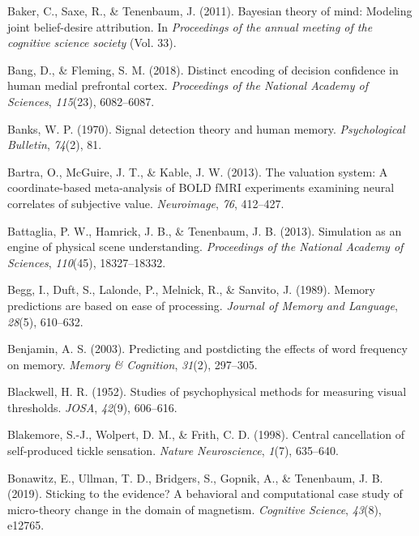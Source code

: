 \documentclass[12pt,twoside]{reedthesis}
\newenvironment{CSLReferences}%
  {}%
  {\par}
\begin{document}
\begin{CSLReferences}{1}{0}
\leavevmode\hypertarget{ref-baker2011bayesian}{}%
Baker, C., Saxe, R., \& Tenenbaum, J. (2011). Bayesian theory of mind: Modeling joint belief-desire attribution. In \emph{Proceedings of the annual meeting of the cognitive science society} (Vol. 33).

\leavevmode\hypertarget{ref-bang2018distinct}{}%
Bang, D., \& Fleming, S. M. (2018). Distinct encoding of decision confidence in human medial prefrontal cortex. \emph{Proceedings of the National Academy of Sciences}, \emph{115}(23), 6082--6087.

\leavevmode\hypertarget{ref-banks1970signal}{}%
Banks, W. P. (1970). Signal detection theory and human memory. \emph{Psychological Bulletin}, \emph{74}(2), 81.

\leavevmode\hypertarget{ref-bartra2013valuation}{}%
Bartra, O., McGuire, J. T., \& Kable, J. W. (2013). The valuation system: A coordinate-based meta-analysis of BOLD fMRI experiments examining neural correlates of subjective value. \emph{Neuroimage}, \emph{76}, 412--427.

\leavevmode\hypertarget{ref-battaglia2013simulation}{}%
Battaglia, P. W., Hamrick, J. B., \& Tenenbaum, J. B. (2013). Simulation as an engine of physical scene understanding. \emph{Proceedings of the National Academy of Sciences}, \emph{110}(45), 18327--18332.

\leavevmode\hypertarget{ref-begg1989memory}{}%
Begg, I., Duft, S., Lalonde, P., Melnick, R., \& Sanvito, J. (1989). Memory predictions are based on ease of processing. \emph{Journal of Memory and Language}, \emph{28}(5), 610--632.

\leavevmode\hypertarget{ref-benjamin2003predicting}{}%
Benjamin, A. S. (2003). Predicting and postdicting the effects of word frequency on memory. \emph{Memory \& Cognition}, \emph{31}(2), 297--305.

\leavevmode\hypertarget{ref-blackwell1952studies}{}%
Blackwell, H. R. (1952). Studies of psychophysical methods for measuring visual thresholds. \emph{JOSA}, \emph{42}(9), 606--616.

\leavevmode\hypertarget{ref-blakemore1998central}{}%
Blakemore, S.-J., Wolpert, D. M., \& Frith, C. D. (1998). Central cancellation of self-produced tickle sensation. \emph{Nature Neuroscience}, \emph{1}(7), 635--640.

\leavevmode\hypertarget{ref-bonawitz2019sticking}{}%
Bonawitz, E., Ullman, T. D., Bridgers, S., Gopnik, A., \& Tenenbaum, J. B. (2019). Sticking to the evidence? A behavioral and computational case study of micro-theory change in the domain of magnetism. \emph{Cognitive Science}, \emph{43}(8), e12765.


\end{CSLReferences}
\end{document}
